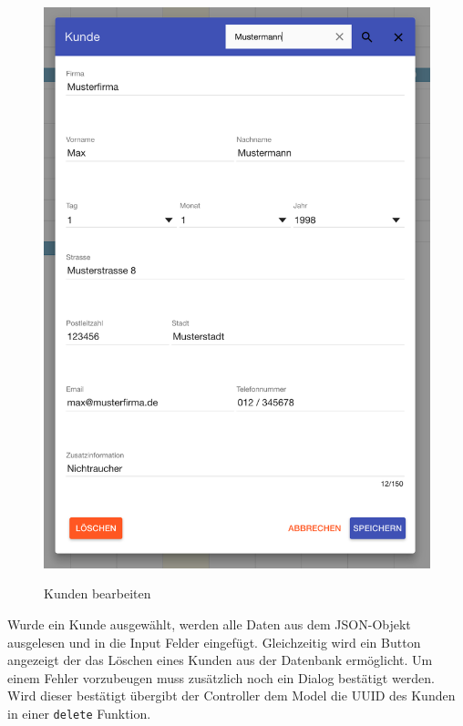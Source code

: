 \begin{figure}[H]
    \hfill
    \begin{minipage}[t]{0.49\linewidth}
        \centering
        \includegraphics[width=\linewidth]{images/frontend_customer_edit.png}
        \label{frontend_customer_edit}
        \caption{Kunden bearbeiten}
    \end{minipage}
\end{figure}

Wurde ein Kunde ausgewählt, werden alle Daten aus dem JSON-Objekt ausgelesen und in die Input Felder eingefügt. Gleichzeitig wird ein Button angezeigt der das Löschen eines Kunden aus der Datenbank ermöglicht. Um einem Fehler vorzubeugen muss zusätzlich noch ein Dialog bestätigt werden. Wird dieser bestätigt übergibt der Controller dem Model die UUID des Kunden in einer \texttt{delete} Funktion. 

